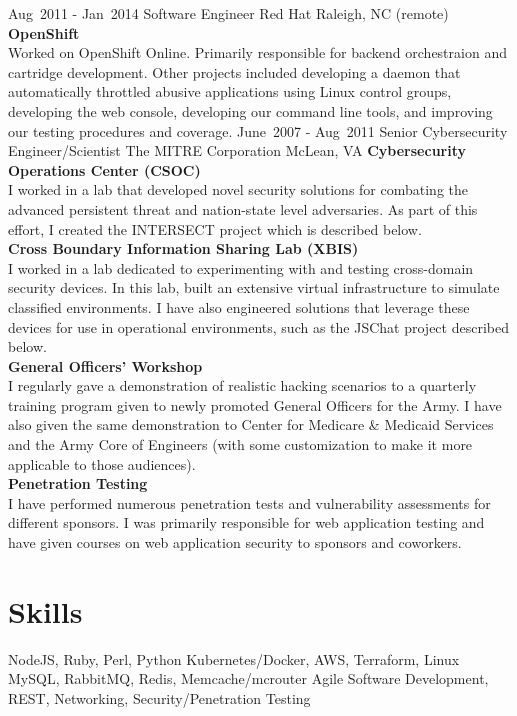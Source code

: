 \documentclass[11pt,letterpaper,sans]{moderncv}
\begin{document}
\cventry
{
\mbox{Aug 2011}
-
\mbox{Jan 2014}
}
{Software Engineer}
{Red Hat}
{Raleigh, NC (remote)}
{}
{
\textbf{OpenShift} \\
Worked on OpenShift Online.
Primarily responsible for backend orchestraion and cartridge development.
Other projects included
developing a daemon that automatically throttled abusive applications using Linux control groups,
developing the web console,
developing our command line tools,
and improving our testing procedures and coverage.
}
\cventry
{
\mbox{June 2007}
-
\mbox{Aug 2011}
}
{Senior Cybersecurity Engineer/Scientist}
{The MITRE Corporation}
{McLean, VA}
{}
{
\textbf{Cybersecurity Operations Center (CSOC)} \\
I worked in a lab that developed novel security solutions for combating the advanced persistent threat and nation-state level adversaries.
As part of this effort, I created the INTERSECT project which is described below.
\\
\textbf{Cross Boundary Information Sharing Lab (XBIS)} \\
I worked in a lab dedicated to experimenting with and testing cross-domain security devices.
In this lab, built an extensive virtual infrastructure to simulate classified environments.
I have also engineered solutions that leverage these devices for use in operational environments, such as the JSChat project described below.
\\
\textbf{General Officers' Workshop} \\
I regularly gave a demonstration of realistic hacking scenarios to a quarterly training program given to newly promoted General Officers for the Army.
I have also given the same demonstration to Center for Medicare \& Medicaid Services and the Army Core of Engineers (with some customization to make it more applicable to those audiences).
\\
\textbf{Penetration Testing} \\
I have performed numerous penetration tests and vulnerability assessments for different sponsors.
I was primarily responsible for web application testing and have given courses on web application security to sponsors and coworkers.
}

\section{Skills}
{
NodeJS,
Ruby, Perl, Python
}
{
Kubernetes/Docker,
AWS,
Terraform,
Linux
}
{
MySQL,
RabbitMQ,
Redis,
Memcache/mcrouter
}
{
Agile Software Development,
REST,
Networking,
Security/Penetration Testing
}
\end{document}
